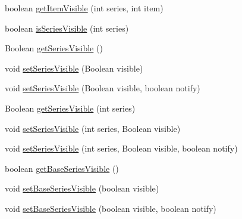 \begin{DoxyCompactItemize}
\item 
boolean \mbox{\hyperlink{interfaceorg_1_1jfree_1_1chart_1_1renderer_1_1category_1_1_category_item_renderer_a133207e3de61ddc33a1fc987c72ecd1f}{get\+Item\+Visible}} (int series, int item)
\item 
boolean \mbox{\hyperlink{interfaceorg_1_1jfree_1_1chart_1_1renderer_1_1category_1_1_category_item_renderer_a3125939180f138dd90b59448d2f44318}{is\+Series\+Visible}} (int series)
\item 
Boolean \mbox{\hyperlink{interfaceorg_1_1jfree_1_1chart_1_1renderer_1_1category_1_1_category_item_renderer_a0769a384dfe60163122348120d334ccf}{get\+Series\+Visible}} ()
\item 
void \mbox{\hyperlink{interfaceorg_1_1jfree_1_1chart_1_1renderer_1_1category_1_1_category_item_renderer_aefe9bb9b43af3cb3b3c72a69af4e1d94}{set\+Series\+Visible}} (Boolean visible)
\item 
void \mbox{\hyperlink{interfaceorg_1_1jfree_1_1chart_1_1renderer_1_1category_1_1_category_item_renderer_ae9bc13ad01ea7e703bd26ac346f737da}{set\+Series\+Visible}} (Boolean visible, boolean notify)
\item 
Boolean \mbox{\hyperlink{interfaceorg_1_1jfree_1_1chart_1_1renderer_1_1category_1_1_category_item_renderer_a1d3a9d0a19083c8c15bfa752455aa924}{get\+Series\+Visible}} (int series)
\item 
void \mbox{\hyperlink{interfaceorg_1_1jfree_1_1chart_1_1renderer_1_1category_1_1_category_item_renderer_a929d5c0d5de37983ac3f83b31b3f2abe}{set\+Series\+Visible}} (int series, Boolean visible)
\item 
void \mbox{\hyperlink{interfaceorg_1_1jfree_1_1chart_1_1renderer_1_1category_1_1_category_item_renderer_acbda5cc4a2a6b7ccc98875c2a7c20713}{set\+Series\+Visible}} (int series, Boolean visible, boolean notify)
\item 
boolean \mbox{\hyperlink{interfaceorg_1_1jfree_1_1chart_1_1renderer_1_1category_1_1_category_item_renderer_a7f6fcee9da6a61416616995353566042}{get\+Base\+Series\+Visible}} ()
\item 
void \mbox{\hyperlink{interfaceorg_1_1jfree_1_1chart_1_1renderer_1_1category_1_1_category_item_renderer_a5f2b5280274a015095a855e988ae1fe1}{set\+Base\+Series\+Visible}} (boolean visible)
\item 
void \mbox{\hyperlink{interfaceorg_1_1jfree_1_1chart_1_1renderer_1_1category_1_1_category_item_renderer_a5a7ae2c6a56f613139fa438dd3667854}{set\+Base\+Series\+Visible}} (boolean visible, boolean notify)
\item 

\end{DoxyCompactItemize}
